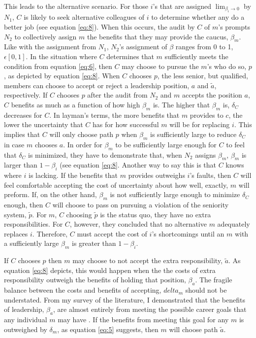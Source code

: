 \documentclass [12pt]{article}
\begin{document}
This leads to the alternative scenario. For those $i$'s that are assigned $\lim_{\beta_i\to 0}$ by $N_1$, $C$ is likely to seek alternative colleagues of $i$ to determine whether any do a better job (see equation \ref{eq:8}). When this occurs, the audit by $C$ of $m$'s prompts $N_2$ to collectively assign $m$ the benefits that they may provide the caucus, $\beta_m$. Like with the assignment from $N_1$, $N_2$'s assignment of $\beta$ ranges from 0 to 1, $\epsilon[0,1]$. In the situation where $C$ determines that $m$ sufficiently meets the condition from equation \ref{eq:6}, then $C$ may choose to pursue the $m$'s who do so, $p$, as depicted by equation \ref{eq:8}. When $C$ chooses $p$, the less senior, but qualified, members can choose to accept or reject a leadership position, $a$ and $\tilde a$, respectively. If $C$ chooses $p$ after the audit from $N_2$ and $m$ accepts the position $a$, $C$ benefits as much as a function of how high $\beta_m$ is. The higher that $\beta_m$ is, $\delta_C$ decreases for $C$. In layman's terms, the more benefits that $m$ provides to $c$, the lower the uncertainty that $C$ has for how successful $m$ will be for replacing $i$. This implies that $C$ will only choose path $p$ when $\beta_m$ is sufficiently large to reduce $\delta_C$ in case $m$ chooses $a$. In order for $\beta_m$ to be sufficiently large enough for $C$ to feel that $\delta_C$ is minimized, they have to demonstrate that, when $N_2$ assigns $\beta_m$, $\beta_m$ is larger than $1-\beta_i$ (see equation \ref{eq:8}. Another way to say this is that $C$ knows where $i$ is lacking. If the benefits that $m$ provides outweighs $i$'s faults, then $C$ will feel comfortable accepting the cost of uncertainty about how well, exactly, $m$ will preform. If, on the other hand, $\beta_m$ is not sufficiently large enough to minimize $\delta_C$ enough, then $C$ will choose to pass on pursuing a violation of the seniority system, $\tilde p$. For $m$, $C$ choosing $\tilde p$ is the status quo, they have no extra responsibilities. For $C$, however, they concluded that no alternative $m$ adequately replaces $i$. Therefore, $C$ must accept the cost of $i$'s shortcomings until an $m$ with a sufficiently large $\beta_m$ is greater than $1-\beta_i$.

If $C$ chooses $p$ then $m$ may choose to not accept the extra responsibility, $\tilde a$. As equation \ref{eq:8} depicts, this would happen when the the costs of extra responsibility outweigh the benefits of holding that position, $\beta_a$. The fragile balance between the costs and benefits of accepting, $delta_m$ should not be understated. From my survey of the literature, I demonstrated that the benefits of leadership, $\beta_a$, are almost entirely from meeting the possible career goals that any individual $m$ may have \cite{Fenno1973}. If the benefits from meeting this goal for any $m$ is outweighed by $\delta_m$, as equation \ref{eq:5} suggests, then $m$ will choose path $\tilde a$. 
\end{document}
